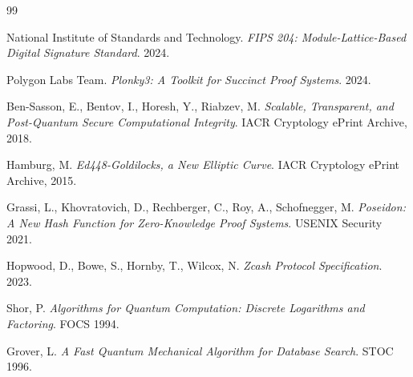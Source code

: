 \documentclass[11pt,a4paper]{article}
\begin{document}
\begin{thebibliography}{99}

National Institute of Standards and Technology.
\textit{FIPS 204: Module-Lattice-Based Digital Signature Standard}.
2024.

Polygon Labs Team.
\textit{Plonky3: A Toolkit for Succinct Proof Systems}.
2024.

Ben-Sasson, E., Bentov, I., Horesh, Y., Riabzev, M.
\textit{Scalable, Transparent, and Post-Quantum Secure Computational Integrity}.
IACR Cryptology ePrint Archive, 2018.

Hamburg, M.
\textit{Ed448-Goldilocks, a New Elliptic Curve}.
IACR Cryptology ePrint Archive, 2015.

Grassi, L., Khovratovich, D., Rechberger, C., Roy, A., Schofnegger, M.
\textit{Poseidon: A New Hash Function for Zero-Knowledge Proof Systems}.
USENIX Security 2021.

Hopwood, D., Bowe, S., Hornby, T., Wilcox, N.
\textit{Zcash Protocol Specification}.
2023.

Shor, P.
\textit{Algorithms for Quantum Computation: Discrete Logarithms and Factoring}.
FOCS 1994.

Grover, L.
\textit{A Fast Quantum Mechanical Algorithm for Database Search}.
STOC 1996.

\end{thebibliography}
\end{document}
